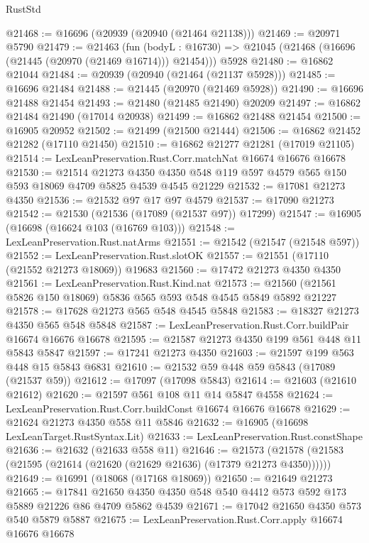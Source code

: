 \begin{lexlean}{RustStd}
\begin{coremodule}
@21468 := @16696 (@20939 (@20940 (@21464 @21138)))
@21469 := @20971 @5790
@21479 := @21463
    (fun (bodyL : @16730) => @21045 (@21468 (@16696 (@21445 (@20970 (@21469 @16714))) @21454)))
    @5928
@21480 := @16862 @21044
@21484 := @20939 (@20940 (@21464 (@21137 @5928)))
@21485 := @16696 @21484
@21488 := @21445 (@20970 (@21469 @5928))
@21490 := @16696 @21488 @21454
@21493 := @21480 (@21485 @21490) @20209
@21497 := @16862 @21484 @21490 (@17014 @20938)
@21499 := @16862 @21488 @21454
@21500 := @16905 @20952
@21502 := @21499 (@21500 @21444)
@21506 := @16862 @21452 @21282 (@17110 @21450)
@21510 := @16862 @21277 @21281 (@17019 @21105)
@21514 := LexLeanPreservation.Rust.Corr.matchNat @16674 @16676 @16678
@21530 := @21514
    @21273
    @4350
    @4350
    @548
    @119
    @597
    @4579
    @565
    @150
    @593
    @18069
    @4709
    @5825
    @4539
    @4545
    @21229
@21532 := @17081 @21273 @4350
@21536 := @21532 @97 @17 @97 @4579
@21537 := @17090 @21273
@21542 := @21530 (@21536 (@17089 (@21537 @97)) @17299)
@21547 := @16905 (@16698 (@16624 @103 (@16769 @103)))
@21548 := LexLeanPreservation.Rust.natArms
@21551 := @21542 (@21547 (@21548 @597))
@21552 := LexLeanPreservation.Rust.slotOK
@21557 := @21551 (@17110 (@21552 @21273 @18069)) @19683
@21560 := @17472 @21273 @4350 @4350
@21561 := LexLeanPreservation.Rust.Kind.nat
@21573 := @21560 (@21561 @5826 @150 @18069) @5836 @565 @593 @548 @4545 @5849 @5892 @21227
@21578 := @17628 @21273 @565 @548 @4545 @5848
@21583 := @18327 @21273 @4350 @565 @548 @5848
@21587 := LexLeanPreservation.Rust.Corr.buildPair @16674 @16676 @16678
@21595 := @21587 @21273 @4350 @199 @561 @448 @11 @5843 @5847
@21597 := @17241 @21273 @4350
@21603 := @21597 @199 @563 @448 @15 @5843 @6831
@21610 := @21532 @59 @448 @59 @5843 (@17089 (@21537 @59))
@21612 := @17097 (@17098 @5843)
@21614 := @21603 (@21610 @21612)
@21620 := @21597 @561 @108 @11 @14 @5847 @4558
@21624 := LexLeanPreservation.Rust.Corr.buildConst @16674 @16676 @16678
@21629 := @21624 @21273 @4350 @558 @11 @5846
@21632 := @16905 (@16698 LexLeanTarget.RustSyntax.Lit)
@21633 := LexLeanPreservation.Rust.constShape
@21636 := @21632 (@21633 @558 @11)
@21646 := @21573 (@21578 (@21583 (@21595 (@21614 (@21620 (@21629 @21636) (@17379 @21273 @4350))))))
@21649 := @16991 (@18068 (@17168 @18069))
@21650 := @21649 @21273
@21665 := @17841
    @21650
    @4350
    @4350
    @548
    @540
    @4412
    @573
    @592
    @173
    @5889
    @21226
    @86
    @4709
    @5862
    @4539
@21671 := @17042 @21650 @4350 @573 @540 @5879 @5887
@21675 := LexLeanPreservation.Rust.Corr.apply @16674 @16676 @16678

\end{coremodule}
\end{lexlean}
